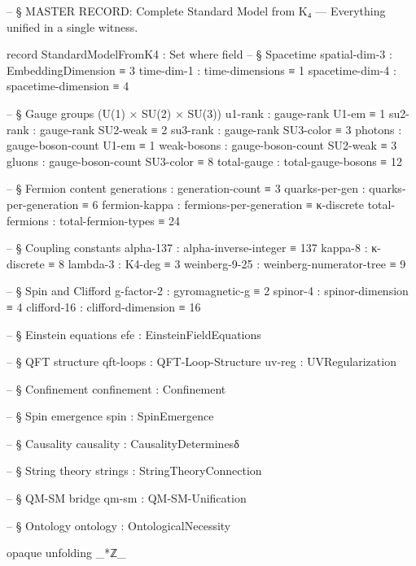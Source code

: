 \documentclass[11pt,a4paper]{book}
\begin{document}

\begin{code}
-- § MASTER RECORD: Complete Standard Model from K₄ — Everything unified in a single witness.

record StandardModelFromK4 : Set where
  field
    -- § Spacetime
    spatial-dim-3    : EmbeddingDimension ≡ 3
    time-dim-1       : time-dimensions ≡ 1
    spacetime-dim-4  : spacetime-dimension ≡ 4

    -- § Gauge groups (U(1) × SU(2) × SU(3))
    u1-rank          : gauge-rank U1-em ≡ 1
    su2-rank         : gauge-rank SU2-weak ≡ 2
    su3-rank         : gauge-rank SU3-color ≡ 3
    photons          : gauge-boson-count U1-em ≡ 1
    weak-bosons      : gauge-boson-count SU2-weak ≡ 3
    gluons           : gauge-boson-count SU3-color ≡ 8
    total-gauge      : total-gauge-bosons ≡ 12

    -- § Fermion content
    generations      : generation-count ≡ 3
    quarks-per-gen   : quarks-per-generation ≡ 6
    fermion-kappa    : fermions-per-generation ≡ κ-discrete
    total-fermions   : total-fermion-types ≡ 24

    -- § Coupling constants
    alpha-137        : alpha-inverse-integer ≡ 137
    kappa-8          : κ-discrete ≡ 8
    lambda-3         : K4-deg ≡ 3
    weinberg-9-25    : weinberg-numerator-tree ≡ 9

    -- § Spin and Clifford
    g-factor-2       : gyromagnetic-g ≡ 2
    spinor-4         : spinor-dimension ≡ 4
    clifford-16      : clifford-dimension ≡ 16

    -- § Einstein equations
    efe              : EinsteinFieldEquations

    -- § QFT structure
    qft-loops        : QFT-Loop-Structure
    uv-reg           : UVRegularization

    -- § Confinement
    confinement      : Confinement

    -- § Spin emergence
    spin             : SpinEmergence

    -- § Causality
    causality        : CausalityDeterminesδ

    -- § String theory
    strings          : StringTheoryConnection

    -- § QM-SM bridge
    qm-sm            : QM-SM-Unification

    -- § Ontology
    ontology         : OntologicalNecessity

opaque
  unfolding _*ℤ_


\end{code}
\end{document}
